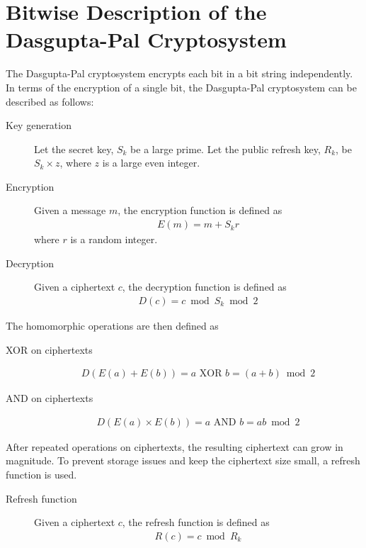 \section{Bitwise Description of the Dasgupta-Pal Cryptosystem}
The Dasgupta-Pal cryptosystem \cite{dasgupta_design_2016} encrypts each bit in a bit string independently.
In terms of the encryption of a single bit, the Dasgupta-Pal cryptosystem can be described as follows:
\begin{description}
	\item[Key generation]
	Let the secret key, $S_k$ be a large prime.
	Let the public refresh key, $R_k$, be $S_k \times z$, where $z$ is a large even integer.
	\item[Encryption]
	Given a message $m$, the encryption function is defined as
	\begin{align*}
		E(m) = m + S_kr
	\end{align*}
	where $r$ is a random integer.
	\item[Decryption]
	Given a ciphertext $c$, the decryption function is defined as
	\begin{align*}
		D(c) = c \bmod S_k \bmod 2
	\end{align*}
\end{description}
The homomorphic operations are then defined as
\begin{description}
	\item[XOR on ciphertexts]
	\begin{align*}
		D(E(a)+E(b)) = a \text{ XOR } b = (a + b) \bmod 2
	\end{align*}
	\item[AND on ciphertexts]
	\begin{align*}
		D(E(a)\times E(b)) = a \text{ AND } b = ab \bmod 2
	\end{align*}
\end{description}
After repeated operations on ciphertexts, the resulting ciphertext can grow in magnitude.
To prevent storage issues and keep the ciphertext size small, a refresh function is used.
\begin{description}
	\item[Refresh function]
	Given a ciphertext $c$, the refresh function is defined as
	\begin{align*}
		R(c) = c \bmod R_k
	\end{align*}
\end{description}
